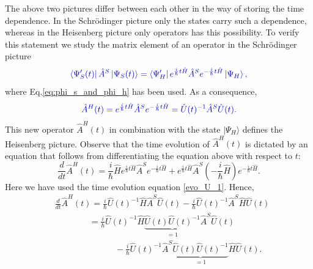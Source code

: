 \documentclass[
12pt, %
english, %
singlespacing, %
headsepline, %
]{MastersDoctoralThesis} %
\begin{document}
The above two pictures differ between each other in the way of storing the time dependence. In the Schrödinger picture only the states carry such a dependence, whereas in the Heisenberg picture only operators has this possibility. To verify this statement we study the matrix element of an operator in the Schrödinger picture
\begin{equation}\label{eq:matrix_ele_time_dep}
\textcolor[RGB]{0,0,204}{
\bra{\Psi^{\prime}_{S}(t)}\hat{A}^{S}\ket{\Psi_{S} (t)}
=\bra{\Psi^{\prime}_{H}}e^{\frac{i}{\hbar}t\hat{H}}\hat{A}^{S}
e^{-\frac{i}{\hbar}t\hat{H}}\ket{\Psi_{H} },
}
\end{equation}
where Eq.\enskip\eqref{eq:phi_s_and_phi_h} has been used. As a consequence, 
\begin{equation}\label{eq:S-H-Operator_Trafo}
\textcolor[RGB]{0,0,204}{
\hat{A}^{H}(t)=e^{\frac{i}{\hbar}t\hat{H}}\hat{A}^{S}
e^{-\frac{i}{\hbar}t\hat{H}}=\hat{U}(t)^{-1}\hat{A}^{S}\hat{U}(t).
}
\end{equation}
This new operator $ \hat{A}^{H}(t) $ in combination with the state $ \vert\Psi_{H} \rangle$ defines the Heisenberg picture. Observe that the time evolution of $ \hat{A}^{H}(t) $  is dictated by an equation that follows from differentiating the equation above with respect to $ t $:
\begin{equation}
\frac{d}{dt}\hat{A}^{H}(t)
=\frac{i}{\hbar}\hat{H}
e^{\frac{i}{\hbar}t \hat{H}}
\hat{A}^{S}
e^{-\frac{i}{\hbar}t \hat{H}}
+e^{\frac{i}{\hbar}t \hat{H}}
\hat{A}^{S}
\left( -\frac{i}{\hbar}\hat{H}\right) 
e^{-\frac{i}{\hbar}t \hat{H}}.
\end{equation}
Here we have used the  time evolution equation \eqref{evo_U_1}. Hence,
\begin{equation}\label{time_evo_seven}
\begin{split}
&\frac{d}{dt}\hat{A}^{H}(t)
	=\frac{i}{\hbar}
	\hat{U}(t)^{-1}\hat{H}\hat{A}^{S}\hat{U}(t)
	-
	\frac{i}{\hbar}
	\hat{U}(t)^{-1}\hat{A}^{S}\hat{H}\hat{U}(t)
	\\
&\qquad\qquad=\frac{i}{\hbar}
	\hat{U}(t)^{-1}\hat{H}\underbrace{\hat{U}(t)\hat{U}(t)^{-1}}_{=1}\hat{A}^{S}\hat{U}(t)
\\	
	&\qquad\qquad\qquad\quad-
	\frac{i}{\hbar}
	\hat{U}(t)^{-1}\hat{A}^{S}\underbrace{\hat{U}(t)\hat{U}(t)^{-1}}_{=1}\hat{H}\hat{U}(t).
\end{split}
\end{equation}
\end{document}
